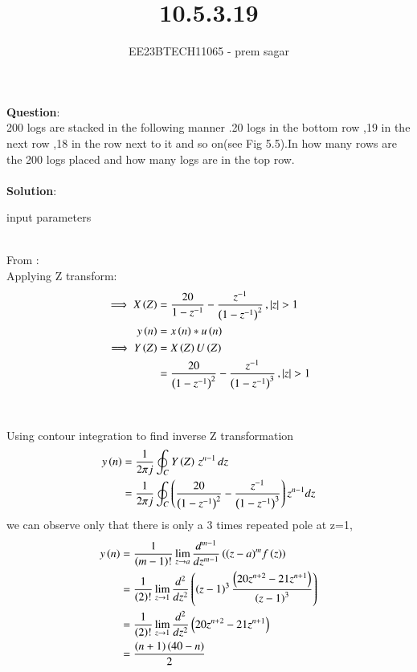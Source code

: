 \documentclass[journal,12pt,twocolumn]{IEEEtran}
\theoremstyle{remark}
\begin{document}

\vspace{3cm}

\title{10.5.3.19}
\author{EE23BTECH11065 - prem sagar}
\maketitle
\newpage

\bigskip 

\renewcommand{\thefigure}{\theenumi}
\renewcommand{\thetable}{\theenumi}
\textbf{Question}:\\ 200 logs are stacked in the following manner .20 logs in the bottom row ,19 in the next row ,18 in the row next to it and so on(see Fig 5.5).In how many rows are the 200 logs placed and how many logs are in the top row.
\\\\\textbf{Solution}:
\begin{table}[!ht]
  \centering
  \renewcommand\thetable{1}
  
  \caption{input parameters}
  \label{tab:10.5.3.19}
  \end{table}
  \\From {}:
  \\Applying Z transform:
\begin{align}
\implies X\left(Z\right)&=\frac{20}{1-z^{-1}}-\frac{z^{-1}}{\left(1-z^{-1}\right)^2}\,,\left\vert z\right\vert>1
\\y\left(n\right)&=x\left(n\right)*u\left(n\right)
\\\implies Y\left(Z\right)&=X\left(Z\right)U\left(Z\right)
\\&=\frac{20}{\left(1-z^{-1}\right)^2}-\frac{z^{-1}}{\left(1-z^{-1}\right)^3}\,,\left\vert z\right\vert>1
\end{align}
\\\\Using contour integration to find  inverse Z transformation
\\\begin{align}
 y\left(n\right)&=\frac{1}{2\pi j}\oint_{C}Y\left(Z    \right)\,z^{n-1}\,dz
\\&=\frac{1}{2\pi j}\oint_{C}\left(\frac{20}{\left(1-z^{-1}\right)^2}-\frac{z^{-1}}{\left(1-z^{-1}\right)^3}\right)z^{n-1}dz
\end{align}
we can observe only that there is only a 3 times repeated pole at z=1,
\begin{align}
 y\left(n\right)&=\frac{1}{\left(m-1\right)!}\lim\limits_{z\to a}\frac{d^{m-1}}{dz^{m-1}}\left({(z-a)}^{m}f\left(z\right)\right)
\\&=\frac{1}{\left(2\right)!}\lim\limits_{z\to1}\frac{d^{2}}{dz^{2}}\left(\left(z-1\right)^3\frac{\left(20z^{n+2}-21z^{n+1}\right)}{\left(z-1\right)^3}\right)
\\&=\frac{1}{\left(2\right)!}\lim\limits_{z\to1}\frac{d^{2}}{dz^{2}}\left(20z^{n+2}-21z^{n+1}\right)
\\&=\frac{\left(n+1\right)\left(40-n\right)}{2}
\end{align}
\end{document}
